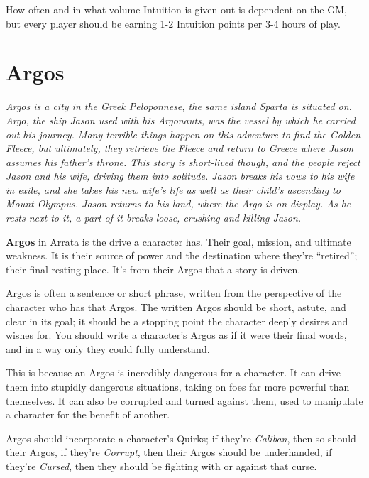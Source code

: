 \documentclass[../main.tex]{subfiles}
\begin{document}
        How often and in what volume Intuition is given out is dependent on the GM, but every player should be earning 1-2 Intuition points per 3-4 hours of play.

    \section{Argos}

        \begin{mdframed}[style=Arrata]
            {\em
                Argos is a city in the Greek Peloponnese, the same island Sparta is situated on. Argo, the ship Jason used with his Argonauts, was the vessel by which he carried out his journey. Many terrible things happen on this adventure to find the Golden Fleece, but ultimately, they retrieve the Fleece and return to Greece where Jason assumes his father's throne. This story is short-lived though, and the people reject Jason and his wife, driving them into solitude. Jason breaks his vows to his wife in exile, and she takes his new wife's life as well as their child's ascending to Mount Olympus. Jason returns to his land, where the Argo is on display. As he rests next to it, a part of it breaks loose, crushing and killing Jason.
            }
        \end{mdframed}
        
        \textbf{Argos} in Arrata is the drive a character has. Their goal, mission, and ultimate weakness. It is their source of power and the destination where they're ``retired''; their final resting place. It's from their Argos that a story is driven.

        Argos is often a sentence or short phrase, written from the perspective of the character who has that Argos. The written Argos should be short, astute, and clear in its goal; it should be a stopping point the character deeply desires and wishes for. You should write a character's Argos as if it were their final words, and in a way only they could fully understand.

        This is because an Argos is incredibly dangerous for a character. It can drive them into stupidly dangerous situations, taking on foes far more powerful than themselves. It can also be corrupted and turned against them, used to manipulate a character for the benefit of another.

        Argos should incorporate a character's Quirks; if they're \emph{Caliban}, then so should their Argos, if they're \emph{Corrupt}, then their Argos should be underhanded, if they're \emph{Cursed}, then they should be fighting with or against that curse.
\end{document}
